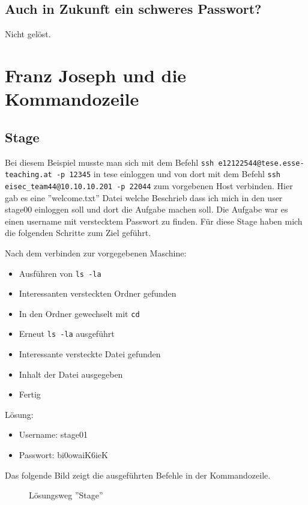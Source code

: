 \documentclass[12pt,a4paper,titlepage,oneside]{scrartcl}
\begin{document}
\subsection{Auch in Zukunft ein schweres Passwort?}
Nicht gelöst.


\section{Franz Joseph und die Kommandozeile}

\subsection{Stage}
Bei diesem Beispiel musste man sich mit dem Befehl \lstinline{ssh e12122544@tese.esse-teaching.at -p 12345} in tese einloggen und von dort mit dem Befehl \lstinline{ssh eisec_team44@10.10.10.201 -p 22044} zum vorgebenen Host verbinden. Hier gab es eine ''welcome.txt'' Datei welche Beschrieb dass ich mich in den user stage00 einloggen soll und dort die Aufgabe machen soll. Die Aufgabe war es einen username mit verstecktem Passwort zu finden. Für diese Stage haben mich die folgenden Schritte zum Ziel geführt.

Nach dem verbinden zur vorgegebenen Maschine:
\begin{itemize}
  \item Ausführen von \lstinline{ls -la}
  \item Interessanten versteckten Ordner gefunden 
  \item In den Ordner gewechselt mit \lstinline{cd}
  \item Erneut \lstinline{ls -la} ausgeführt
  \item Interessante versteckte Datei gefunden
  \item Inhalt der Datei ausgegeben
  \item Fertig
\end{itemize}
  
Lösung: 
\begin{itemize} 
  \item Username: stage01
  \item Passwort: bi0owaiK6ieK
\end{itemize}
Das folgende Bild zeigt die ausgeführten Befehle in der Kommandozeile.
  \begin{figure}[h!]
    \centering
    \caption{Lösungsweg ''Stage''}
    \label{fig:stage_solution}
  \end{figure}
\end{document}
